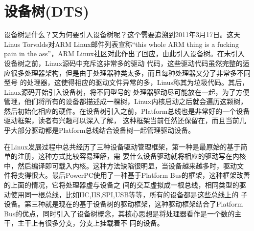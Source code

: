 \chapter{设备树(DTS)}
设备树是什么？又为何要引入设备树呢？这个需要追溯到2011年3月17日。这天
Linus Torvalds对ARM Linux邮件列表宣称“this whole ARM thing is a fucking pain in the 
ass”，ARM Linux社区对此作出了回应，由此引入设备树。在未引入设备树之前，Linux源码中充斥这非常多的驱动
代码，这些驱动代码虽然完整的适应很多处理器架构，但是由于处理器种类太多，而且每种处理器又分了非常多不同型号
的处理器，这使得相应的驱动文件异常的多，Linus称其为垃圾代码。其后，Linux源码开始引入设备树，将不同型号的
处理器驱动尽可能放在一起，为了方便管理，他们将所有的设备都描述成一棵树，Linux内核启动之后就会遍历这颗树，
然后初始化相应的硬件。在设备树引入之前，Platform总线也是非常好的一个设备驱动框架，读者有兴趣可以深入了解，
这种框架当前任然还保留在，而且当前几乎大部分驱动都是Platform总线结合设备树一起管理驱动设备。


在Linux发展过程中总共经历了三种设备驱动管理框架，第一种是最原始的基于简单的注册，这种方式比较容易理解，需
要什么设备驱动就将相应的驱动写在内核中，然后编译即可载入内核。这种方法缺陷很明显，当设备越来越多时，驱动文
件将变得很大。最后PowerPC使用了一种基于Platform Bus的框架，这种框架改善的上面的情况，它将处理器虚与设备之
间的交互虚拟成一根总线，相同类型的驱动使用同一根总线，比如IIC,IIS,SPI,USB等等，所有的设备都是这些总线上的
子设备。第三种就是现在的基于设备树的驱动框架，这种驱动框架结合了Platform 
Bus的优点，同时引入了设备树概念，其核心思想是将处理器看作是一个数的主干，主干上有很多分支，分支上挂载着不
同的设备。


